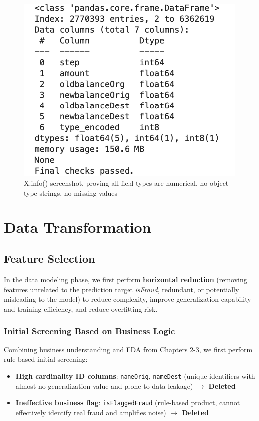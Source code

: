 \documentclass[sigplan,screen]{acmart}
\begin{document}
\begin{figure}[h!]
    \centering
    \includegraphics[width=0.9\columnwidth]{3.5b.png}
    \caption{X.info() screenshot, proving all field types are numerical, no object-type strings, no missing values}
    \label{fig:final_features_info}
\end{figure}

\section{Data Transformation}

\subsection{Feature Selection}

In the data modeling phase, we first perform \textbf{horizontal reduction} (removing features unrelated to the prediction target \textit{isFraud}, redundant, or potentially misleading to the model) to reduce complexity, improve generalization capability and training efficiency, and reduce overfitting risk.

\subsubsection{Initial Screening Based on Business Logic}

Combining business understanding and EDA from Chapters 2-3, we first perform rule-based initial screening:

\begin{itemize}
    \item \textbf{High cardinality ID columns}: \texttt{nameOrig}, \texttt{nameDest} (unique identifiers with almost no generalization value and prone to data leakage) $\rightarrow$ \textbf{Deleted}
    \item \textbf{Ineffective business flag}: \texttt{isFlaggedFraud} (rule-based product, cannot effectively identify real fraud and amplifies noise) $\rightarrow$ \textbf{Deleted}
\end{itemize}
\end{document}
